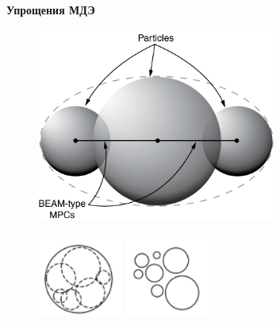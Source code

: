 \documentclass[c]{beamer}  %
\begin{document}
\begin{frame}
\frametitle{\insertsection} 
\framesubtitle{Упрощения МДЭ}

\begin{figure}[h!]
	\centering
	\includegraphics[width=0.7\textwidth]{dem-rigid-cluster}
\end{figure} 
\end{frame}

\begin{frame}

\begin{figure}[h!]
	\centering
	\includegraphics[width=0.25\textwidth]{break_before}
	\includegraphics[width=0.25\textwidth]{break_after}
\end{figure} 
\end{frame}


 
\end{document}
